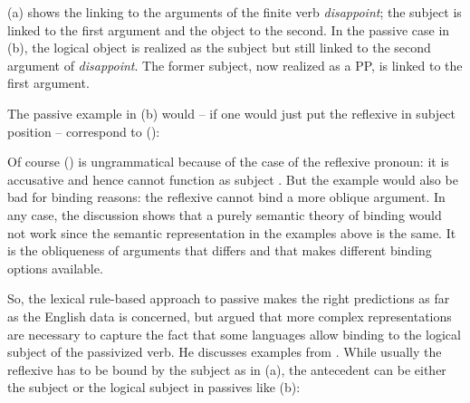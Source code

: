 \documentclass[output=paper
 	        ,biblatex
                ,babelshorthands
                ,newtxmath
                ,draftmode
                ,colorlinks, citecolor=brown
]{langscibook}
\begin{document}
{\jamwidth=5cm
\eal
{}
\zl
(a) shows the linking to the arguments of the finite verb \emph{disappoint}; the subject is
linked to the first argument and the object to the second. In the passive case in (b), the
logical object is realized as the subject but still linked to the second argument of
\emph{disappoint}. The former subject, now realized as a PP, is linked to the first argument. 

The passive example in (b) would -- if one would just put the reflexive in subject position
-- correspond to ():
\z
}

\noindent
Of course () is ungrammatical because of the case of the reflexive pronoun: it is accusative
and hence cannot function as subject \citep[]{Brame77}. But the example would also be bad for binding reasons: the
reflexive cannot bind a more oblique argument. In any case, the discussion shows that a purely
semantic theory of binding would not work since the semantic representation in the examples above is
the same. It is the obliqueness of arguments that differs and that makes different binding options available.

So, the lexical rule-based approach to passive makes the right predictions as far as the English
data is concerned, but \citet{Perlmutter1984} argued that more complex representations are necessary to capture the
fact that some languages allow binding to the logical subject of the passivized verb. He discusses
examples from . While usually the reflexive has to be bound by the subject as in
(a), the antecedent can be either the subject or the logical subject in passives like (b):
\end{document}
